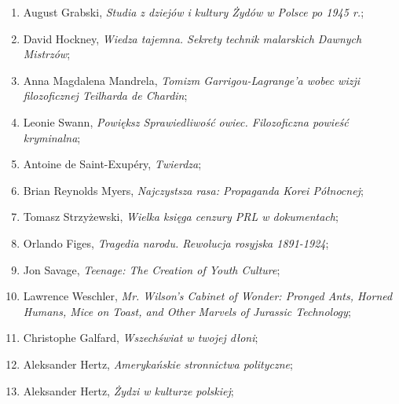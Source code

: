 \documentclass[a4paper,11pt]{article}
\begin{document}
\begin{enumerate}
\item August Grabski, \textit{Studia z dziejów i kultury Żydów w Polsce
    po 1945 r.};



\item David Hockney, \textit{Wiedza tajemna. Sekrety technik malarskich
    Dawnych Mistrzów};



\item Anna Magdalena Mandrela, \textit{Tomizm Garrigou-Lagrange’a wobec
    wizji filozoficznej Teilharda de Chardin};



\item Leonie Swann, \textit{Powiększ Sprawiedliwość owiec. Filozoficzna
    powieść kryminalna};



\item Antoine de Saint-Exupéry, \textit{Twierdza};



\item Brian Reynolds Myers, \textit{Najczystsza rasa: Propaganda Korei
    Północnej};



\item Tomasz Strzyżewski, \textit{Wielka księga cenzury PRL w
    dokumentach};



\item Orlando Figes, \textit{Tragedia narodu. Rewolucja rosyjska
    1891-1924};



\item Jon Savage, \textit{Teenage: The Creation of Youth Culture};



\item Lawrence Weschler, \textit{Mr. Wilson's Cabinet of Wonder: Pronged
    Ants, Horned Humans, Mice on Toast, and Other Marvels of Jurassic
    Technology};



\item Christophe Galfard, \textit{Wszechświat w twojej dłoni};



\item Aleksander Hertz, \textit{Amerykańskie stronnictwa polityczne};



\item Aleksander Hertz, \textit{Żydzi w kulturze polskiej};




\end{enumerate}
\end{document}
